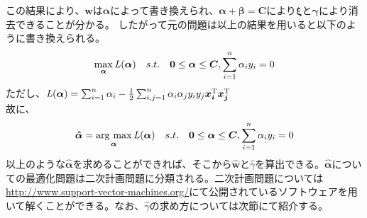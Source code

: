 この結果により、$\bm{w}$は$\bm{\alpha}$によって書き換えられ、$\bm{\alpha} + \bm{\beta} = \bm{C}$により$\bm{\xi}$と$\bm{\gamma}$により消去できることが分かる。
したがって元の問題は以上の結果を用いると以下のように書き換えられる。
\begin{equation}
  \max_{\bm{\alpha}}{\it{L}}(\bm{\alpha})\text{\ \ \ }s.t.\text{\ \ \ }\bm{0}\le\bm{\alpha}\le\bm{C}, \sum_{i=1}^{n}\alpha_iy_i = 0
\end{equation}
ただし、${\it{L}}(\bm{\alpha}) = \sum_{i=1}^{n}\alpha_i - \frac{1}{2}\sum_{i,j=1}^{n}\alpha_i\alpha_jy_iy_j\bm{x_i}^{\mathrm{T}}\bm{x_j}^{\mathrm{T}}$ \\
故に、
\begin{equation}
  \bm{\hat{\alpha}} = \argmax_{\bm{\alpha}}{\it{L}}(\bm{\alpha})\text{\ \ \ }s.t.\text{\ \ \ }\bm{0}\le\bm{\alpha}\le\bm{C}, \sum_{i=1}^{n}\alpha_iy_i = 0
\end{equation}
以上のような$\bm{\hat{\alpha}}$を求めることができれば、そこから$\bm{\hat{w}}$と$\hat{\gamma}$を算出できる。$\bm{\hat{\alpha}}$についての最適化問題は二次計画問題に分類される。二次計画問題については\url{http://www.support-vector-machines.org/}にて公開されているソフトウェアを用いて解くことができる。なお、$\hat{\gamma}$の求め方については次節にて紹介する。
    
    


  
 

  
  

